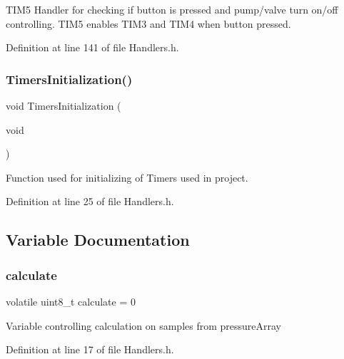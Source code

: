 T\+I\+M5 Handler for checking if button is pressed and pump/valve turn on/off controlling. T\+I\+M5 enables T\+I\+M3 and T\+I\+M4 when button pressed. 



Definition at line 141 of file Handlers.\+h.

\mbox{\label{group___handlers_ga8811e30ebd5ea09370ba3796b69a5c6a_ga8811e30ebd5ea09370ba3796b69a5c6a}} 
\subsubsection{\texorpdfstring{TimersInitialization()}{TimersInitialization()}}
{\footnotesize\ttfamily void Timers\+Initialization (\begin{DoxyParamCaption}\item[{void}]{ }\end{DoxyParamCaption})}



Function used for initializing of Timers used in project. 



Definition at line 25 of file Handlers.\+h.



\subsection{Variable Documentation}
\mbox{\label{group___handlers_ga31b840eb0bc7dbaaf882425d21292c4e_ga31b840eb0bc7dbaaf882425d21292c4e}} 
\subsubsection{\texorpdfstring{calculate}{calculate}}
{\footnotesize\ttfamily volatile uint8\+\_\+t calculate = 0}

Variable controlling calculation on samples from pressure\+Array 

Definition at line 17 of file Handlers.\+h.

\mbox{\label{group___handlers_ga562013b342dd86247a6939ec1da5a52e_ga562013b342dd86247a6939ec1da5a52e}} 

